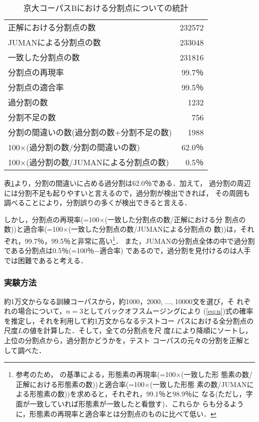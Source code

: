 \begin{table}[htbp]
  \begin{center}
    \caption{京大コーパスBにおける分割点についての統計}
    \begin{tabular}{|lr|}
      \hline
      正解における分割点の数 & 232572 \\
      JUMANによる分割点の数 & 233048 \\
      一致した分割点の数 & 231816 \\
      分割点の再現率 & 99.7％ \\
      分割点の適合率 & 99.5％ \\
      \hline
      過分割の数 &  1232 \\
      分割不足の数 & 756 \\
      分割の間違いの数(過分割の数+分割不足の数) & 1988\\
      100$\times$(過分割の数/分割の間違いの数) & 62.0％ \\
      100$\times$(過分割の数/JUMANによる分割点の数) & 0.5％ \\
      \hline
    \end{tabular}
    \label{tab:stat}
  \end{center}
\end{table}

表\ref{tab:stat}より，分割の間違いに占める過分割は62.0％である．加えて，
過分割の周辺には分割不足も起りやすいと言えるので，過分割が検出できれば，
その周囲も調べることにより，分割誤りの多くが検出できると言える．

しかし，分割点の再現率(=100$\times$(一致した分割点の数/正解における分
割点の数))と適合率(=100$\times$(一致した分割点の数/JUMANによる分割点の
数))は，それぞれ，99.7％，99.5％と非常に高い\footnote{参考のため，
  \cite{nagata94}の基準による，形態素の再現率(=100$\times$(一致した形
  態素の数/正解における形態素の数))と適合率(=100$\times$(一致した形態
  素の数/JUMANによる形態素の数))を求めると，それぞれ，99.1％と98.9％に
  なる(ただし，字面が一致していれば形態素が一致したと看倣す)．これらか
  らも分るように，形態素の再現率と適合率とは分割点のものに比べて低い．}．
また，JUMANの分割点全体の中で過分割である分割点は0.5％(=100％$-$適合率)
であるので，過分割を見付けるのは人手では困難であると考える．

\subsubsection*{実験方法}

約1万文からなる訓練コーパスから，約1000，2000, ..., 10000文を選び，そ
れぞれの場合について，$n=3$としてバックオフスムージングにより
(\ref{eq:n})式の確率を推定し，それを利用して約1万文からなるテストコー
パスにおける全分割点の尺度$L$の値を計算した．そして，全ての分割点を尺
度$L$により降順にソートし，上位の分割点から，過分割かどうかを，テスト
コーパスの元々の分割を正解として調べた．

